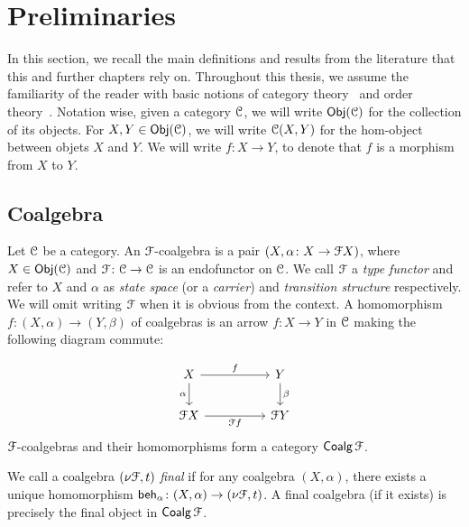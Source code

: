 \section{Preliminaries}\label{c2:sec:preliminaries}
In this section, we recall the main definitions and results from the literature that this and further chapters rely on. Throughout this thesis, we assume the familiarity of the reader with basic notions of category theory~\cite{Abramsky:2010:Introduction} and order theory~\cite{Davey:2002:Introduction}. Notation wise, given a category $\mathcal{C}$, we will write $\mathsf{Obj}(\mathcal{C})$ for the collection of its objects. For $X,Y \in \mathsf{Obj}(\mathcal{C})$, we will write $\mathcal{C}(X,Y)$ for the hom-object between objets $X$ and $Y$. We will write $f \colon X \to Y$, to denote that $f$ is a morphism from $X$ to $Y$.
\subsection{Coalgebra}\label{c2:subsec:coalgebra}

Let $\mathcal{C}$ be a category.  An $\mathcal{F}$-coalgebra is a pair $(X, \alpha \colon X \to \mathcal{F} X)$, where $X \in \mathsf{Obj}(\mathcal{C})$ and $\mathcal{F} \colon \mathcal{C} \to \mathcal{C}$ is an endofunctor on $\mathcal{C}$. We call $\mathcal{F}$ a \emph{type functor} and refer to $X$ and $\alpha$ as \emph{state space} (or a \emph{carrier}) and \emph{transition structure} respectively. We will omit writing $\mathcal{F}$ when it is obvious from the context. A homomorphism $f \colon (X, \alpha) \to (Y, \beta)$ of coalgebras is an arrow $f \colon X \to Y$ in $\mathcal{C}$ making the following diagram commute:

\[\begin{tikzcd}
	X && Y \\
	{\funF X} && {\funF Y}
	\arrow["f", from=1-1, to=1-3]
	\arrow["\alpha"', from=1-1, to=2-1]
	\arrow["\beta", from=1-3, to=2-3]
	\arrow["{\funF f}"', from=2-1, to=2-3]
\end{tikzcd}\]
$\mathcal{F}$-coalgebras and their homomorphisms form a category $\mathop{\mathsf{Coalg}}{\mathcal{F}}$. 

\begin{definition}\label{c2:def:final_coalgebra}
We call a coalgebra $(\nu \mathcal{F}, t)$ \emph{final} if for any coalgebra $(X, \alpha)$, there exists a unique homomorphism $\mathsf{beh}_{\alpha} \colon (X, \alpha) \to (\nu \mathcal{F}, t)$. A final coalgebra (if it exists) is precisely the final object in $\mathop{\mathsf{Coalg}}{\mathcal{F}}$.	
\end{definition}

